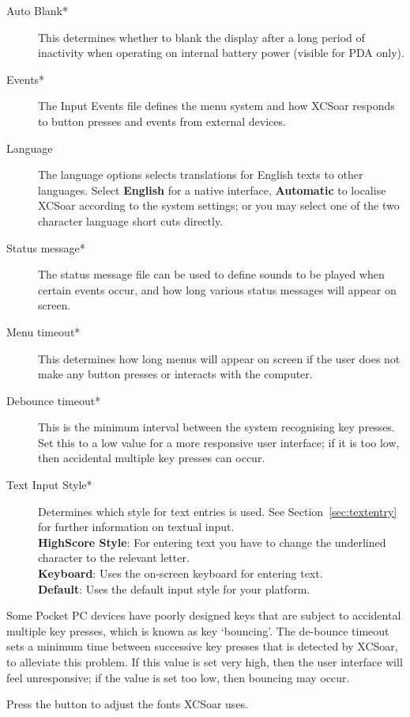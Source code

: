 \begin{description}
\item[Auto Blank*] This determines whether to blank the display after a long
  period of inactivity when operating on internal battery power (visible for PDA
  only).
\item[Events*]  The Input Events file defines the menu system and how XCSoar
  responds to button presses and events from external devices.
\item[Language]  The language options selects translations for English texts to
  other languages.  Select {\bf English} for a native interface, {\bf Automatic}
  to localise XCSoar according to the system settings; or you may select one of 
  the two character language short cuts directly.
\item[Status message*]  The status message file can be used to define sounds to 
  be played when certain events occur, and how long various status messages will 
  appear on screen.
\item[Menu timeout*]  This determines how long menus will appear on screen if the user
  does not make any button presses or interacts with the computer.
\item[Debounce timeout*]  This is the minimum interval between the system 
  recognising key presses.  Set this to a low value for a more responsive user 
  interface; if it is too low, then accidental multiple key presses can occur.
\item[Text Input Style*]  Determines which style for text entries is used. 
  See Section~\ref{sec:textentry} for further information on textual input. \\
  {\bf HighScore Style}: For entering text you have to change the underlined 
  character to the relevant letter. \\
  {\bf Keyboard}: Uses the on-screen keyboard for entering text. \\
  {\bf Default}: Uses the default input style for your platform.
\end{description}

Some Pocket PC devices have poorly designed keys that are subject to
accidental multiple key presses, which is known as key `bouncing'.  The
de-bounce timeout sets a minimum time between successive key presses
that is detected by XCSoar, to alleviate this problem.  If this value
is set very high, then the user interface will feel unresponsive; if
the value is set too low, then bouncing may occur.

Press the  button to adjust the fonts XCSoar uses.


